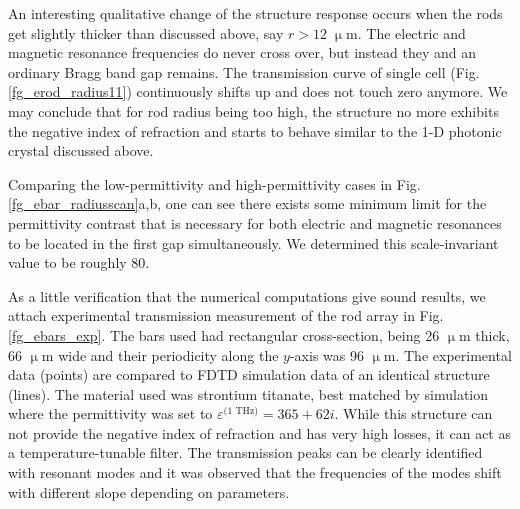 {An interesting qualitative change of the structure response occurs when the rods get slightly thicker than discussed above, say $r > 12\;\upmu$m. The electric and magnetic resonance frequencies do never cross over, but instead they  and an ordinary Bragg band gap remains. The transmission curve of single cell (Fig. \ref{fg_erod_radius11}) continuously shifts up and does not touch zero anymore. We may conclude that for rod radius being too high, the structure no more exhibits the negative index of refraction and starts to behave similar to the 1-D photonic crystal discussed above.


Comparing the low-permittivity and high-permittivity cases in Fig. \ref{fg_ebar_radiusscan}a,b, one can see there exists some minimum limit for the permittivity contrast that is necessary for both electric and magnetic resonances to be located in the first gap simultaneously. We determined this scale-invariant value to be roughly 80.

As a little verification that the numerical computations give sound results, we attach experimental transmission measurement of the rod array in Fig. \ref{fg_ebars_exp}.
The bars used had rectangular cross-section, being 26 $\upmu$m thick, 66 $\upmu$m  wide and their periodicity along the $y$-axis was 96 $\upmu$m.  The experimental data (points) are compared to FDTD simulation data of an identical structure (lines). The material used was strontium titanate, best matched by simulation where the permittivity was set to $\varepsilon^{\text{(1 THz)}} = 365 + 62i$.  While this structure can not provide the negative index of refraction and has very high losses, it can act as a temperature-tunable filter. The transmission peaks can be clearly identified with resonant modes and it was observed that the frequencies of the modes shift with different slope depending on parameters.  
} 

